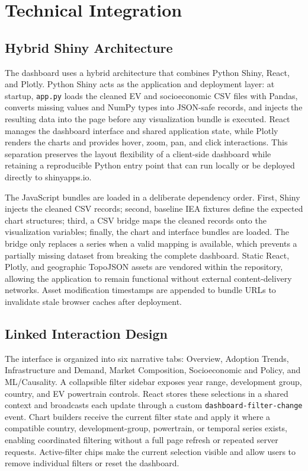 \section{Technical Integration}

\subsection{Hybrid Shiny Architecture}
The dashboard uses a hybrid architecture that combines Python Shiny, React, and Plotly. Python Shiny acts as the application and deployment layer: at startup, \texttt{app.py} loads the cleaned EV and socioeconomic CSV files with Pandas, converts missing values and NumPy types into JSON-safe records, and injects the resulting data into the page before any visualization bundle is executed. React manages the dashboard interface and shared application state, while Plotly renders the charts and provides hover, zoom, pan, and click interactions. This separation preserves the layout flexibility of a client-side dashboard while retaining a reproducible Python entry point that can run locally or be deployed directly to shinyapps.io.

The JavaScript bundles are loaded in a deliberate dependency order. First, Shiny injects the cleaned CSV records; second, baseline IEA fixtures define the expected chart structures; third, a CSV bridge maps the cleaned records onto the visualization variables; finally, the chart and interface bundles are loaded. The bridge only replaces a series when a valid mapping is available, which prevents a partially missing dataset from breaking the complete dashboard. Static React, Plotly, and geographic TopoJSON assets are vendored within the repository, allowing the application to remain functional without external content-delivery networks. Asset modification timestamps are appended to bundle URLs to invalidate stale browser caches after deployment.

\subsection{Linked Interaction Design}
The interface is organized into six narrative tabs: Overview, Adoption Trends, Infrastructure and Demand, Market Composition, Socioeconomic and Policy, and ML/Causality. A collapsible filter sidebar exposes year range, development group, country, and EV powertrain controls. React stores these selections in a shared context and broadcasts each update through a custom \texttt{dashboard-filter-change} event. Chart builders receive the current filter state and apply it where a compatible country, development-group, powertrain, or temporal series exists, enabling coordinated filtering without a full page refresh or repeated server requests. Active-filter chips make the current selection visible and allow users to remove individual filters or reset the dashboard.

